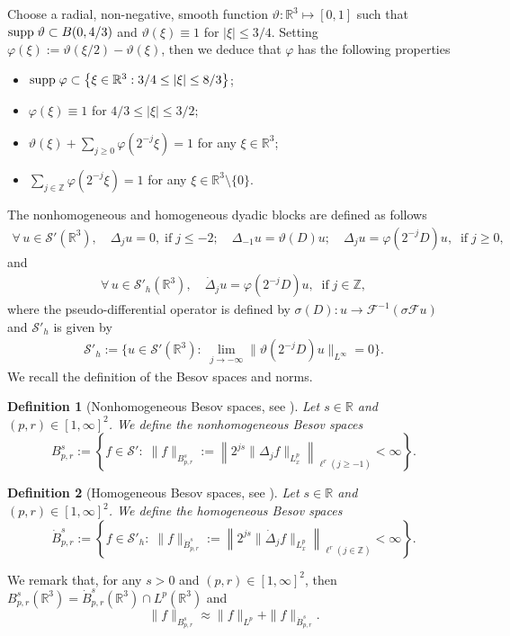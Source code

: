 \documentclass[12pt]{article}
\newtheorem{definition}{Definition}[section]
\newcommand{\R}{\mathbb{R}}
\newcommand{\f}{\left}
\newcommand{\g}{\right}
\begin{document}
Choose a radial, non-negative, smooth function $\vartheta:\R^3\mapsto [0,1]$ such that
 ${\rm{supp}} \;\vartheta\subset B(0, 4/3)$ and $\vartheta(\xi)\equiv1$ for $|\xi|\leq3/4$.
Setting $\varphi(\xi):=\vartheta(\xi/2)-\vartheta(\xi)$, then we deduce that $\varphi$ has the following properties
\begin{itemize}
  \item ${\rm{supp}} \;\varphi\subset \left\{\xi\in \R^3: 3/4\leq|\xi|\leq8/3\right\}$;
  \item $\varphi(\xi)\equiv 1$ for $4/3\leq |\xi|\leq 3/2$;
  \item $\vartheta(\xi)+\sum_{j\geq0}\varphi(2^{-j}\xi)=1$ for any $\xi\in \R^3$;
  \item $\sum_{j\in \mathbb{Z}}\varphi(2^{-j}\xi)=1$ for any $\xi\in \R^3\setminus\{0\}$.
\end{itemize}
The nonhomogeneous and homogeneous dyadic blocks are defined as follows
\begin{align*}
\forall\, u\in \mathcal{S'}(\R^3),\quad \Delta_ju=0,\; \text{if}\; j\leq-2;\quad
\Delta_{-1}u=\vartheta(D)u;\quad
\Delta_ju=\varphi(2^{-j}D)u,\; \; \text{if}\;j\geq0,
\end{align*}
and
\begin{align*}
\forall\, u\in \mathcal{S}'_h(\R^3),\quad
\dot{\Delta}_ju=\varphi(2^{-j}D)u,\; \; \text{if}\;j\in \mathbb{Z},
\end{align*}
where the pseudo-differential operator is defined by $\sigma(D):u\to\mathcal{F}^{-1}(\sigma \mathcal{F}u)$ and $\mathcal{S}'_h$ is given by
\begin{eqnarray*}
\mathcal{S}'_h:=\Big\{u \in \mathcal{S'}(\mathbb{R}^{3}):\; \lim_{j\rightarrow-\infty}\|\vartheta(2^{-j}D)u\|_{L^{\infty}}=0 \Big\}.
\end{eqnarray*}
We recall the definition of the Besov spaces and norms.
\begin{definition}[Nonhomogeneous Besov spaces, see \cite{B}]
Let $s\in\mathbb{R}$ and $(p,r)\in[1, \infty]^2$. We define the nonhomogeneous Besov spaces
$$
B^{s}_{p,r}:=\f\{f\in \mathcal{S}':\;\|f\|_{B^{s}_{p,r}}:=\left\|2^{js}\|\Delta_jf\|_{L_x^p}\right\|_{\ell^r(j\geq-1)}<\infty\g\}.
$$
\end{definition}
\begin{definition}[Homogeneous Besov spaces, see \cite{B}]
Let $s\in\mathbb{R}$ and $(p,r)\in[1, \infty]^2$. We define the homogeneous Besov spaces
$$
\dot{B}^{s}_{p,r}:=\f\{f\in \mathcal{S}'_h:\;\|f\|_{\dot{B}^{s}_{p,r}}:=\left\|2^{js}\|\dot{\Delta}_jf\|_{L_x^p}\right\|_{\ell^r(j\in \mathbb{Z})}<\infty\g\}.
$$
\end{definition}
We remark that, for any $s>0$ and $(p,r)\in[1, \infty]^2$, then $B^{s}_{p,r}(\R^3)=\dot{B}^{s}_{p,r}(\R^3)\cap L^p(\R^3)$ and
$$\|f\|_{B^{s}_{p,r}}\approx \|f\|_{L^{p}}+\|f\|_{\dot{B}^{s}_{p,r}}.$$
\end{document}
